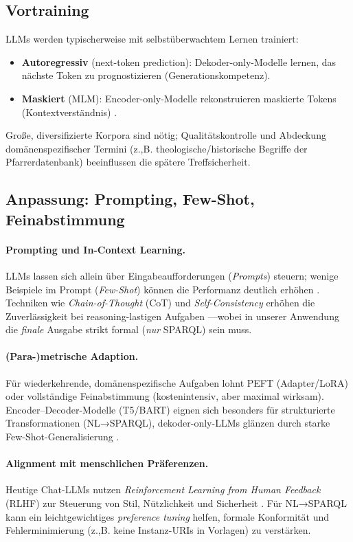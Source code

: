 \subsection{Vortraining}
LLMs werden typischerweise mit selbstüberwachtem Lernen trainiert:
\begin{itemize}
\item \textbf{Autoregressiv} (next-token prediction): Dekoder-only-Modelle lernen, das nächste Token zu prognostizieren (Generationskompetenz).
\item \textbf{Maskiert} (MLM): Encoder-only-Modelle rekonstruieren maskierte Tokens (Kontextverständnis) \cite{devlin2019bert}.
\end{itemize}
Große, diversifizierte Korpora sind nötig; Qualitätskontrolle und Abdeckung domänenspezifischer Termini (z.,B. theologische/historische Begriffe der Pfarrerdatenbank) beeinflussen die spätere Treffsicherheit.

\subsection{Anpassung: Prompting, Few-Shot, Feinabstimmung}
\paragraph{Prompting und In-Context Learning.} LLMs lassen sich allein über Eingabeaufforderungen (\emph{Prompts}) steuern; wenige Beispiele im Prompt (\emph{Few-Shot}) können die Performanz deutlich erhöhen \cite{brown2020language,zhao2021calibrate}. Techniken wie \emph{Chain-of-Thought} (CoT) und \emph{Self-Consistency} erhöhen die Zuverlässigkeit bei reasoning-lastigen Aufgaben \cite{wei2022cot,wang2023selfconsistency,kojima2022zshot}—wobei in unserer Anwendung die \emph{finale} Ausgabe strikt formal (\emph{nur} SPARQL) sein muss.

\paragraph{(Para-)metrische Adaption.} Für wiederkehrende, domänenspezifische Aufgaben lohnt PEFT (Adapter/LoRA) oder vollständige Feinabstimmung (kostenintensiv, aber maximal wirksam). Encoder–Decoder-Modelle (T5/BART) eignen sich besonders für strukturierte Transformationen (NL→SPARQL), dekoder-only-LLMs glänzen durch starke Few-Shot-Generalisierung \cite{raffel2020t5,lewis2020bart,brown2020language}.

\paragraph{Alignment mit menschlichen Präferenzen.} Heutige Chat-LLMs nutzen \emph{Reinforcement Learning from Human Feedback} (RLHF) zur Steuerung von Stil, Nützlichkeit und Sicherheit \cite{christiano2017rlhf,ouyang2022instructgpt}. Für NL→SPARQL kann ein leichtgewichtiges \emph{preference tuning} helfen, formale Konformität und Fehlerminimierung (z.,B. keine Instanz-URIs in Vorlagen) zu verstärken.

